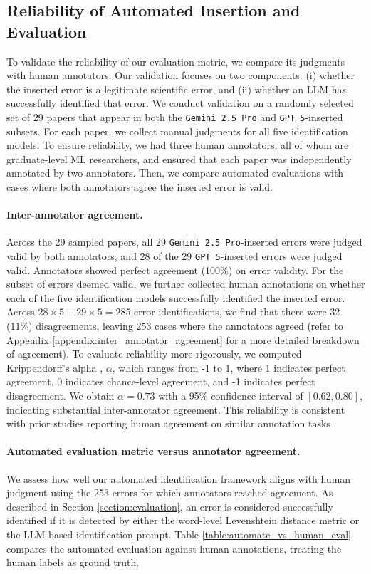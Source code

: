 \documentclass{article}
\newcommand{\gemini}{\texttt{Gemini 2.5 Pro}}
\newcommand{\gpt}{\texttt{GPT 5}}
\begin{document}
\subsection{Reliability of Automated Insertion and Evaluation}
\label{section:manual_annotation}
To validate the reliability of our evaluation metric, we compare its judgments with human annotators. Our validation focuses on two components: (i) whether the inserted error is a legitimate scientific error, and (ii) whether an LLM has successfully identified that error. We conduct validation on a randomly selected set of 29 papers that appear in both the \gemini{} and \gpt{}-inserted subsets. For each paper, we collect manual judgments for all five identification models. To ensure reliability, we had three human annotators, all of whom are graduate-level ML researchers, and ensured that each paper was independently annotated by two annotators. Then, we compare automated evaluations with cases where both annotators agree the inserted error is valid.

\paragraph{Inter-annotator agreement.} Across the 29 sampled papers, all 29 \gemini{}-inserted errors were judged valid by both annotators, and 28 of the 29 \gpt{}-inserted errors were judged valid. Annotators showed perfect agreement (100\%) on error validity. For the subset of errors deemed valid, we further collected human annotations on whether each of the five identification models successfully identified the inserted error. Across $28\times5+29\times5=285$ error identifications, we find that there were 32 (11\%) disagreements, leaving 253 cases where the annotators agreed (refer to Appendix \ref{appendix:inter_annotator_agreement} for a more detailed breakdown of agreement). To evaluate reliability more rigorously, we computed Krippendorff's alpha \citep{krippendorff2011}, $\alpha$, which ranges from -1 to 1, where 1 indicates perfect agreement, 0 indicates chance-level agreement, and -1 indicates perfect disagreement. We obtain $\alpha = 0.73$ with a 95\% confidence interval of $[0.62, 0.80]$, indicating substantial inter-annotator agreement. This reliability is consistent with prior studies reporting human agreement on similar annotation tasks \citep{guo2023, dycke2025}. 


\paragraph{Automated evaluation metric versus annotator agreement.} 
We assess how well our automated identification framework aligns with human judgment using the 253 errors for which annotators reached agreement. As described in Section \ref{section:evaluation}, an error is considered successfully identified if it is detected by either the word-level Levenshtein distance metric or the LLM-based identification prompt. Table \ref{table:automate_vs_human_eval} compares the automated evaluation against human annotations, treating the human labels as ground truth. 
\end{document}
